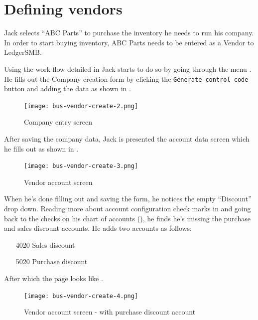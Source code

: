 \section{Defining vendors}
\label{sec-stock-defining-vendors}

Jack selects ``ABC Parts'' to purchase the inventory he needs to run his company. In
order to start buying inventory, ABC Parts needs to be entered as a Vendor to LedgerSMB.

Using the work flow detailed in  Jack starts to do so by going through the menu .
He fills out the Company creation form by clicking the {\tt Generate control code}
button and adding the data as shown in .

\begin{figure}[h]
\centering
\texttt{[image: bus-vendor-create-2.png]}
\caption{Company entry screen}
\label{fig:vendor-create-1}
\end{figure}

After saving the company data, Jack is presented the account data screen which he fills out
as shown in .

\begin{figure}[h]
\centering
\texttt{[image: bus-vendor-create-3.png]}
\caption{Vendor account screen}
\label{fig:vendor-create-2}
\end{figure}

When he's done filling out and saving the form,
he notices the empty ``Discount'' drop down. Reading more about account configuration
check marks in  and going back to the checks on his
chart of accounts (), he finds he's missing the purchase and
sales discount accounts. He adds two accounts as follows:

\begin{itemize}
\item [4020] Sales discount
\item [5020] Purchase discount
\end{itemize}

After which the page looks like .

\begin{figure}[h]
\centering
\texttt{[image: bus-vendor-create-4.png]}
\caption{Vendor account screen - with purchase discount account}
\label{fig:vendor-create-3}
\end{figure}

